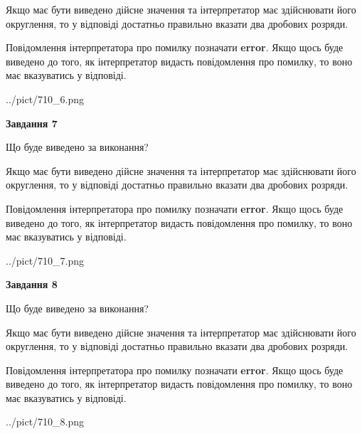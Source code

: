 \documentclass[12pt, ukrainian]{article}
\begin{document}
{\begin {Large}
Якщо має бути виведено дійсне значення та інтерпретатор має здійснювати його округлення, 
то у відповіді достатньо правильно вказати два дробових розряди.

Повідомлення інтерпретатора про помилку позначати \textbf{error}.
Якщо щось буде виведено до того, як інтерпретатор видасть повідомлення про помилку, 
то воно має вказуватись у відповіді. \par

\begin{center}
	{../pict/710_6.png}
\end{center}
\newpage

{\begin {center}\textbf{Завдання 7}\end {center}}\par
Що буде виведено за виконання? \par

Якщо має бути виведено дійсне значення та інтерпретатор має здійснювати його округлення, 
то у відповіді достатньо правильно вказати два дробових розряди.

Повідомлення інтерпретатора про помилку позначати \textbf{error}.
Якщо щось буде виведено до того, як інтерпретатор видасть повідомлення про помилку, 
то воно має вказуватись у відповіді. \par

\begin{center}
	{../pict/710_7.png}
\end{center}
\newpage

{\begin {center}\textbf{Завдання 8}\end {center}}\par
Що буде виведено за виконання? \par

Якщо має бути виведено дійсне значення та інтерпретатор має здійснювати його округлення, 
то у відповіді достатньо правильно вказати два дробових розряди.

Повідомлення інтерпретатора про помилку позначати \textbf{error}.
Якщо щось буде виведено до того, як інтерпретатор видасть повідомлення про помилку, 
то воно має вказуватись у відповіді. \par

\begin{center}
	{../pict/710_8.png}
\end{center}
\newpage


\end{Large}}
\end{document}
